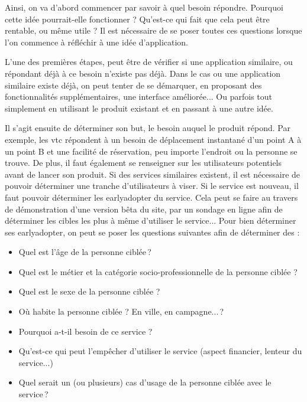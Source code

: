 Ainsi, on va d'abord commencer par savoir à quel besoin répondre. Pourquoi cette idée pourrait-elle fonctionner ? Qu'est-ce qui fait que cela peut être rentable, ou même utile ? Il est nécessaire de se poser toutes ces questions lorsque l'on commence à réfléchir à une idée d'application.

L'une des premières étapes, peut être de vérifier si une application similaire, ou répondant déjà à ce besoin n'existe pas déjà. Dans le cas ou une application similaire existe déjà, on peut tenter de se démarquer, en proposant des fonctionnalités supplémentaires, une interface améliorée... Ou parfois tout simplement en utilisant le produit existant et en passant à une autre idée.

Il s'agit ensuite de déterminer son but, le besoin auquel le produit répond. Par exemple, les \gls{vtc} répondent à un besoin de déplacement instantané d'un point A à un point B et une facilité de réservation, peu importe l'endroit ou la personne se trouve. De plus, il faut également se renseigner sur les utilisateurs potentiels avant de lancer son produit. Si des services similaires existent, il est nécessaire de pouvoir déterminer une tranche d'utilisateurs à viser. Si le service est nouveau, il faut pouvoir déterminer les \gls{earlyadopter} du service. Cela peut se faire au travers de démonstration d'une version bêta du site, par un sondage en ligne afin de déterminer les cibles les plus à même d'utiliser le service... Pour bien déterminer ses \gls{earlyadopter}, on peut se poser les questions suivantes afin de déterminer des  :

\begin{itemize}
	\setlength\itemsep{-0.5em}
	\item Quel est l'âge de la personne ciblée ?
	\item Quel est le métier et la catégorie socio-professionnelle de la personne ciblée ?
	\item Quel est le sexe de la personne ciblée ? 
	\item Où habite la personne ciblée ? En ville, en campagne... ? 
	\item Pourquoi a-t-il besoin de ce service ? 
	\item Qu'est-ce qui peut l'empêcher d'utiliser le service (aspect financier, lenteur du service...) 
	\item Quel serait un (ou plusieurs) cas d'usage de la personne ciblée avec le service ?
\end{itemize}

